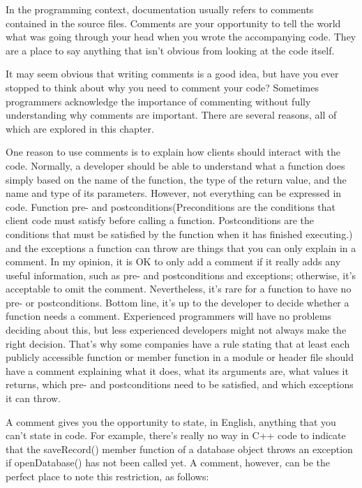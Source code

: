 
In the programming context, documentation usually refers to comments contained in the source files. Comments are your opportunity to tell the world what was going through your head when you wrote the accompanying code. They are a place to say anything that isn’t obvious from looking at the code itself.


It may seem obvious that writing comments is a good idea, but have you ever stopped to think about why you need to comment your code? Sometimes programmers acknowledge the importance of commenting without fully understanding why comments are important. There are several reasons, all of which are explored in this chapter.



One reason to use comments is to explain how clients should interact with the code. Normally, a developer should be able to understand what a function does simply based on the name of the function, the type of the return value, and the name and type of its parameters. However, not everything can be expressed in code. Function pre- and postconditions(Preconditions are the conditions that client code must satisfy before calling a function. Postconditions are the conditions that must be satisfied by the function when it has finished executing.) and the exceptions a function can throw are things that you can only explain in a comment. In my opinion, it is OK to only add a comment if it really adds any useful information, such as pre- and postconditions and exceptions; otherwise, it’s acceptable to omit the comment. Nevertheless, it’s rare for a function to have no pre- or postconditions. Bottom line, it’s up to the developer to decide whether a function needs a comment. Experienced programmers will have no problems deciding about this, but less experienced developers might not always make the right decision. That’s why some companies have a rule stating that at least each publicly accessible function or member function in a module or header file should have a comment explaining what it does, what its arguments are, what values it returns, which pre- and postconditions need to be satisfied, and which exceptions it can throw.

A comment gives you the opportunity to state, in English, anything that you can’t state in code. For example, there’s really no way in C++ code to indicate that the saveRecord() member function of a database object throws an exception if openDatabase() has not been called yet. A comment, however, can be the perfect place to note this restriction, as follows:

